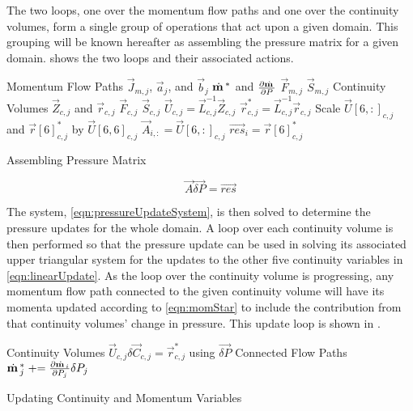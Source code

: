 The two loops, one over the momentum flow paths and one over the continuity volumes, form a single group of operations that act upon a given domain.
This grouping will be known hereafter as assembling the pressure matrix for a given domain.
 shows the two loops and their associated actions.

\begin{algo}[ht!]
\setlength{\baselineskip}{0.625\baselineskip}
\begin{algorithmic}[1]
\Loop \; Momentum Flow Paths
	\Calculate $\vec{J}_{m, j}$, $\vec{a}_{j}$, and $\vec{b}_{j}$
	\Calculate $\momVec{}^{*}$ and $\frac{\partial \momVec{}}{\partial P}$
	\Calculate $\vec{F}_{m, j}$	
	\Calculate $\vec{S}_{m, j}$	
\EndLoop
\Loop \; Continuity Volumes
   	\Calculate $\vec{Z}_{c,j}$ and $\vec{r}_{c, j}$
 	\Calculate $\vec{F}_{c, j}$	
	\Calculate $\vec{S}_{c, j}$	
   	\Calculate $\vec{U}_{c, j} = \vec{L}_{c, j}^{-1} \vec{Z}_{c, j}$
   	\Calculate $\vec{r}^{*}_{c, j} = \vec{L}_{c, j}^{-1} \vec{r}_{c, j}$
   	\Set Scale $\vec{U}[6, :]_{c, j}$ and $\vec{r}[6]^{*}_{c, j}$ by $\vec{U}[6,6]_{c, j}$
   	\Set $\vec{A}_{i, :} = \vec{U}[6,:]_{c, j}$
   	\Set $\vec{res}_{i} = \vec{r}[6]^{*}_{c, j}$
\EndLoop
\end{algorithmic}
\caption{Assembling Pressure Matrix}
\label{alg:xschem}
\end{algo}

\begin{equation}
\label{eqn:pressureUpdateSystem}
\vec{A} \vec{\delta P} = \vec{res}
\end{equation}

The system, \eqref{eqn:pressureUpdateSystem}, is then solved to determine the pressure updates for the whole domain.
A loop over each continuity volume is then performed so that the pressure update can be used in solving its associated upper triangular system for the updates to the other five continuity variables in \eqref{eqn:linearUpdate}.
As the loop over the continuity volume is progressing, any momentum flow path connected to the given continuity volume will have its momenta updated according to \eqref{eqn:momStar} to include the contribution from that continuity volumes' change in pressure. 
This update loop is shown in .

\begin{algo}[ht!]
\setlength{\baselineskip}{0.625\baselineskip}
\begin{algorithmic}[1]
\Loop \; Continuity Volumes
	\Solve $\vec{U}_{c, j} \delta \vec{C}_{c, j} = \vec{r}^{*}_{c, j}$ using $\vec{\delta P}$		
	\Loop \; Connected Flow Paths
		\Set $\momVec{}^{*}_{j} \pluseq  \frac{\partial \momVec{}_{i}}{\partial P_{j}} \delta P_{j}$
	\EndLoop
\EndLoop
\end{algorithmic}
\caption{Updating Continuity and Momentum Variables}
\label{alg:updateVariables}
\end{algo}

